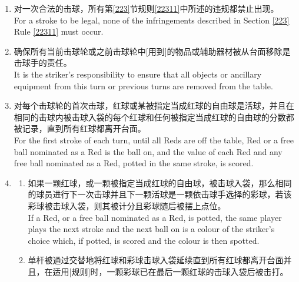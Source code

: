\begin{enumerate}[label=(\alph*)]
\begin{enumerate}[label=(\roman*)]
        it shall continue in the normal way if another stroke is made, or if an infringement is committed during the first stroke or after the completion of the first stroke, with the correct order of starting being resumed in the following frame such that one player or side will have started in three consecutive frames; or
        \item \label{2233diii}若僵局事件被\declare{}(\see{}第\ref{223}节规则\ref{22317})，则其应被正确的某球员或某方重新开启。\\
        it shall, in the event of a stalemate being declared (see Section \ref{223} Rule \ref{22317}), be re-started by the correct player or side.
    \end{enumerate}
    \item 对一次合法的击球，所有第\ref{223}节规则\ref{22311}中所述的违规都禁止出现。\\
    For a stroke to be legal, none of the infringements described in Section \ref{223} Rule \ref{22311} must occur.
    \item 确保所有当前击球轮或之前击球轮中[用到]的物品或辅助器材被从台面移除是击球手的责任。\\
    It is the striker's responsibility to ensure that all objects or ancillary equipment from this turn or previous turns are removed from the table.
    \item 对每个击球轮的首次击球，红球或某被指定当成红球的自由球是活球，并且在相同的击球内被击球入袋的每个红球和任何被指定当成红球的自由球的分数都被记录，直到所有红球都离开台面。\\
    For the first stroke of each turn, until all Reds are off the table, Red or a free ball nominated as a Red is the ball on, and the value of each Red and any free ball nominated as a Red, potted in the same stroke, is scored.
    \item \label{2233h}
    \begin{enumerate}[label=(\roman*)]
        \item 如果一颗红球，或一颗被指定当成红球的自由球，被击球入袋，那么相同的球员进行下一次击球并且下一颗活球是一颗依击球手选择的彩球，若该彩球被击球入袋，则其被计分且彩球随后被摆上点位。\\
        If a Red, or a free ball nominated as a Red, is potted, the same player plays the next stroke and the next ball on is a colour of the striker's choice which, if potted, is scored and the colour is then spotted.
        \item 单杆被通过交替地将红球和彩球击球入袋延续直到所有红球都离开台面并且，在适用[规则]时，一颗彩球已在最后一颗红球的击球入袋后被击打。\\

\end{enumerate}
\end{enumerate}
